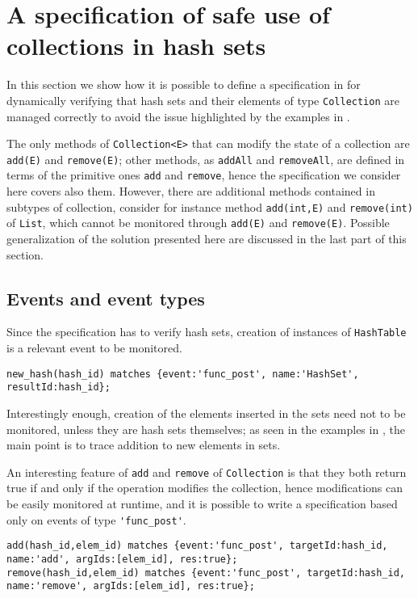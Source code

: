 \section{A specification of safe use of collections in hash sets}
\label{sec:spec}
In this section we show how it is possible to define a specification in \rml for dynamically verifying that hash sets and their elements of
type \lstinline{Collection} are managed correctly to avoid the issue highlighted by the examples in .

The only methods of \lstinline{Collection<E>} that can modify the state of a collection are \lstinline{add(E)} and \lstinline{remove(E)}; other methods, as \lstinline{addAll} and \lstinline{removeAll}, are defined in terms of the primitive ones \lstinline{add} and \lstinline{remove}, hence the specification we consider here covers also them. However, there are additional methods contained in subtypes of collection, consider for instance method
\lstinline{add(int,E)} and \lstinline{remove(int)} of \lstinline{List}, which cannot be monitored through \lstinline{add(E)} and \lstinline{remove(E)}. Possible generalization of the solution presented here are discussed in the last part of this section.

\subsection*{Events and event types} Since the specification has to verify hash sets, creation of instances of \lstinline{HashTable} is a relevant event
to be monitored.
\begin{lstlisting}[basicstyle=\ttfamily\scriptsize]
new_hash(hash_id) matches {event:'func_post', name:'HashSet', resultId:hash_id};
\end{lstlisting}
Interestingly enough, creation of the elements inserted in the sets need not to be monitored, unless they are hash sets themselves;
as seen in the examples in , the main point is to trace addition to new elements in sets.

An interesting feature of \lstinline{add} and \lstinline{remove} of \lstinline{Collection} is that they both return true if and only if the operation modifies the collection, hence modifications can be easily monitored at runtime, and it is possible to write a specification based only on events of type \lstinline{'func_post'}.

\begin{lstlisting}[basicstyle=\ttfamily\scriptsize]
add(hash_id,elem_id) matches {event:'func_post', targetId:hash_id, name:'add', argIds:[elem_id], res:true};
remove(hash_id,elem_id) matches {event:'func_post', targetId:hash_id, name:'remove', argIds:[elem_id], res:true};
\end{lstlisting}

